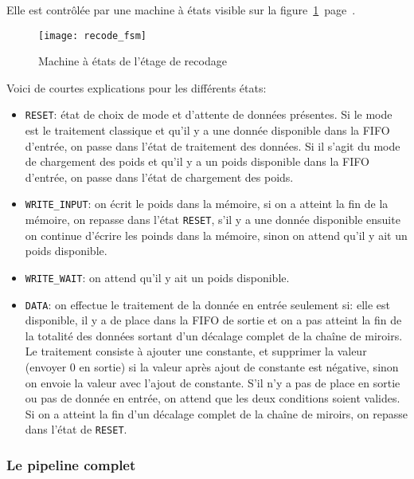 Elle est contrôlée par une machine à états visible sur la
figure~\ref{fig:recode_fsm}~page~\pageref{fig:recode_fsm}.

\begin{figure}[h!]
	\texttt{[image: recode\_fsm]}
	\caption{Machine à états de l'étage de recodage}
	\label{fig:recode_fsm}
\end{figure}

Voici de courtes explications pour les différents états:
\begin{itemize}
	\item \verb+RESET+: état de choix de mode et d'attente de données présentes.
		Si le mode est le traitement classique et qu'il y a une donnée
		disponible dans la FIFO d'entrée, on passe dans l'état de traitement
		des données. Si il s'agit du mode de chargement des poids
		et qu'il y a un poids disponible dans la FIFO d'entrée, on passe dans l'état
		de chargement des poids.
	\item \verb+WRITE_INPUT+: on écrit le poids dans la mémoire,
		si on a atteint la fin de la mémoire, on repasse dans l'état \verb+RESET+,
		s'il y a une donnée
		disponible ensuite on continue d'écrire les poinds dans la mémoire,
		sinon on attend qu'il y ait un poids disponible.
	\item \verb+WRITE_WAIT+: on attend qu'il y ait un poids disponible.
	\item \verb+DATA+: on effectue le traitement de la donnée en entrée seulement si:
		elle est disponible, il y a de place dans la FIFO de sortie et on a pas atteint
		la fin de la totalité des données sortant d'un décalage complet de la chaîne
		de miroirs. Le traitement consiste à ajouter une constante, et supprimer la valeur
		(envoyer 0 en sortie) si la valeur après ajout de constante est négative, sinon on
		envoie la valeur avec l'ajout de constante.
		S'il n'y a pas de place en sortie ou pas de donnée en entrée, on attend que les deux conditions
		soient valides.
		Si on a atteint la fin d'un décalage complet de la chaîne de miroirs, on repasse dans
		l'état de \verb+RESET+.
\end{itemize}



\subsubsection{Le pipeline complet}

